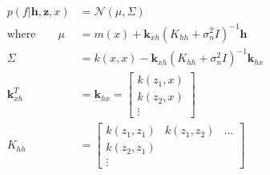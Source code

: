 \documentclass{article}
\begin{document}
\begin{equation}
    \begin{aligned}
        p(f|\boldsymbol{h},\boldsymbol{z},x)     & =\mathcal{N}(\mu, \Sigma)           \\
        \text{where}\quad\quad\mu & =m(x) + \boldsymbol{k}_{xh}(K_{hh}+\sigma_n^2 I)^{-1}\boldsymbol{h} \\
        \Sigma                    & =k(x, x)-\boldsymbol{k}_{xh}(K_{hh}+\sigma_n^2 I)^{-1}\boldsymbol{k}_{hx}        \\
        \boldsymbol{k}_{xh}^T                  & =\boldsymbol{k}_{hx}=\begin{bmatrix}
                                                k(z_1, x) \\
                                                k(z_2, x) \\
                                                \vdots
                                            \end{bmatrix}                  \\
        K_{hh}                    & =\begin{bmatrix}
                                         k(z_1,z_1) & k(z_1, z_2) & \hdots \\
                                         k(z_2,z_1) &             &        \\
                                         \vdots     &             &
                                     \end{bmatrix}
    \end{aligned}
    \label{eq:GP_pred}
\end{equation}
\end{document}
